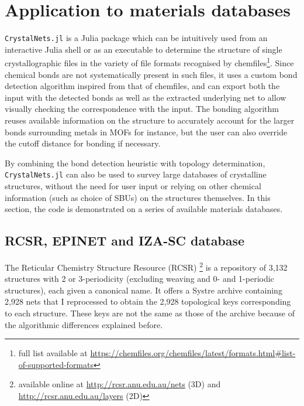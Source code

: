 \documentclass[main.tex]{subfiles}
\begin{document}


\section{Application to materials databases}

\texttt{CrystalNets.jl} is a Julia package which can be intuitively used from an interactive Julia shell or as an executable to determine the structure of single crystallographic files in the variety of file formats recognised by chemfiles\footnote{full list available at \url{https://chemfiles.org/chemfiles/latest/formats.html\#list-of-supported-formats}}. Since chemical bonds are not systematically present in such files, it uses a custom bond detection algorithm inspired from that of chemfiles, and can export both the input with the detected bonds as well as the extracted underlying net to allow visually checking the correspondence with the input. The bonding algorithm reuses available information on the structure to accurately account for the larger bonds surrounding metals in MOFs for instance, but the user can also override the cutoff distance for bonding if necessary.

By combining the bond detection heuristic with topology determination, \texttt{CrystalNets.jl} can also be used to survey large databases of crystalline structures, without the need for user input or relying on other chemical information (such as choice of SBUs) on the structures themselves. In this section, the code is demonstrated on a series of available materials databases.

\subsection{RCSR, EPINET and IZA-SC database}

The Reticular Chemistry Structure Resource (RCSR) \autocite{RCSR} \footnote{available online at \url{http://rcsr.anu.edu.au/nets} (3D) and \url{http://rcsr.anu.edu.au/layers} (2D)} is a repository of 3,132 structures with 2 or 3-periodicity (excluding weaving and 0- and 1-periodic structures), each given a canonical name. It offers a Systre archive containing 2,928 nets that I reprocessed to obtain the 2,928 topological keys corresponding to each structure. These keys are not the same as those of the archive because of the algorithmic differences explained before.
\end{document}
